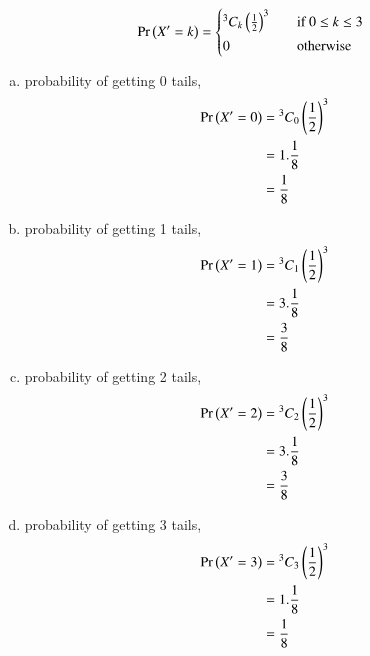 \documentclass[journal,12pt,twocolumn]{IEEEtran}
\begin{document}
\begin{enumerate}[(i)]
\begin{align}
   \pr{X'=k} =
  \begin{cases*}
    {^3 C_k}\brak{\frac{1}{2}}^{3} \quad& if $0 \leq k \leq 3$ \\
    0 \quad& otherwise
  \end{cases*}
\end{align}

\begin{enumerate}[(a)]
\item probability of getting 0 tails,
    \begin{align}
        \begin{split}
            \Pr\left(X'=0\right) &= {^3C_0}\left(\frac{1}{2}\right)^3\\
            &=1.\frac{1}{8}\\
            &=\frac{1}{8}
        \end{split}
    \end{align}

\item probability of getting 1 tails,
    \begin{align}
        \begin{split}
            \Pr\left(X'=1\right) &= {^3C_1}\left(\frac{1}{2}\right)^3\\
            &=3.\frac{1}{8}\\
            &=\frac{3}{8}
        \end{split}
    \end{align}

\item probability of getting 2 tails,
    \begin{align}
        \begin{split}
            \Pr\left(X'=2\right) &= {^3C_2}\left(\frac{1}{2}\right)^3\\
            &=3.\frac{1}{8}\\
            &=\frac{3}{8}
        \end{split}
    \end{align}

\item probability of getting 3 tails,
    \begin{align}
        \begin{split}
            \Pr\left(X'=3\right) &= {^3C_3}\left(\frac{1}{2}\right)^3\\
            &=1.\frac{1}{8}\\
            &=\frac{1}{8}
        \end{split}
    \end{align}
\end{enumerate}


\end{enumerate}
\end{document}
